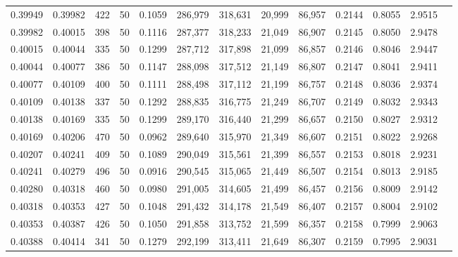 \begin{tabular}{rrrrrrrrrrrrr}
0.39949 & 0.39982 &   422 &  50 &                                     0.1059 & 286,979 & 318,631 &  20,999 &  86,957 & 0.2144 & 0.8055 & 2.9515 \\
0.39982 & 0.40015 &   398 &  50 &                                     0.1116 & 287,377 & 318,233 &  21,049 &  86,907 & 0.2145 & 0.8050 & 2.9478 \\
0.40015 & 0.40044 &   335 &  50 &                                     0.1299 & 287,712 & 317,898 &  21,099 &  86,857 & 0.2146 & 0.8046 & 2.9447 \\
0.40044 & 0.40077 &   386 &  50 &                                     0.1147 & 288,098 & 317,512 &  21,149 &  86,807 & 0.2147 & 0.8041 & 2.9411 \\
0.40077 & 0.40109 &   400 &  50 &                                     0.1111 & 288,498 & 317,112 &  21,199 &  86,757 & 0.2148 & 0.8036 & 2.9374 \\
0.40109 & 0.40138 &   337 &  50 &                                     0.1292 & 288,835 & 316,775 &  21,249 &  86,707 & 0.2149 & 0.8032 & 2.9343 \\
0.40138 & 0.40169 &   335 &  50 &                                     0.1299 & 289,170 & 316,440 &  21,299 &  86,657 & 0.2150 & 0.8027 & 2.9312 \\
0.40169 & 0.40206 &   470 &  50 &                                     0.0962 & 289,640 & 315,970 &  21,349 &  86,607 & 0.2151 & 0.8022 & 2.9268 \\
0.40207 & 0.40241 &   409 &  50 &                                     0.1089 & 290,049 & 315,561 &  21,399 &  86,557 & 0.2153 & 0.8018 & 2.9231 \\
0.40241 & 0.40279 &   496 &  50 &                                     0.0916 & 290,545 & 315,065 &  21,449 &  86,507 & 0.2154 & 0.8013 & 2.9185 \\
0.40280 & 0.40318 &   460 &  50 &                                     0.0980 & 291,005 & 314,605 &  21,499 &  86,457 & 0.2156 & 0.8009 & 2.9142 \\
0.40318 & 0.40353 &   427 &  50 &                                     0.1048 & 291,432 & 314,178 &  21,549 &  86,407 & 0.2157 & 0.8004 & 2.9102 \\
0.40353 & 0.40387 &   426 &  50 &                                     0.1050 & 291,858 & 313,752 &  21,599 &  86,357 & 0.2158 & 0.7999 & 2.9063 \\
0.40388 & 0.40414 &   341 &  50 &                                     0.1279 & 292,199 & 313,411 &  21,649 &  86,307 & 0.2159 & 0.7995 & 2.9031 \\

\end{tabular}

